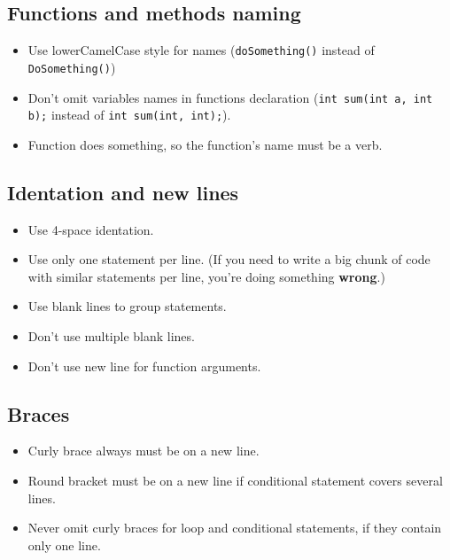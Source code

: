\documentclass[12pt]{article}
\newcommand{\code}[1]{\colorbox{verylightgray}{\lstinline!#1!}}
\begin{document}
		\subsection{Functions and methods naming}
			\begin{itemize}
				\item Use lowerCamelCase style for names (\code{doSomething()} instead of \code{DoSomething()})
				\item Don't omit variables names in functions declaration (\code{int sum(int a, int b);} instead of \code{int sum(int, int);}).
				\item Function does something, so the function's name must be a verb.
			\end{itemize}

		\subsection{Identation and new lines}
			\begin{itemize}
				\item Use 4-space identation.
				\item Use only one statement per line. (If you need to write a big chunk of code with similar statements per line, you're doing something \textbf{wrong}.)
				\item Use blank lines to group statements.
				\item Don't use multiple blank lines.
				\item Don't use new line for function arguments.
			\end{itemize}

		\subsection{Braces}
			\begin{itemize}
				\item Curly brace always must be on a new line.
				\item Round bracket must be on a new line if conditional statement covers several lines.
				\item Never omit curly braces for loop and conditional statements, if they contain only one line.
			\end{itemize}
\end{document}
